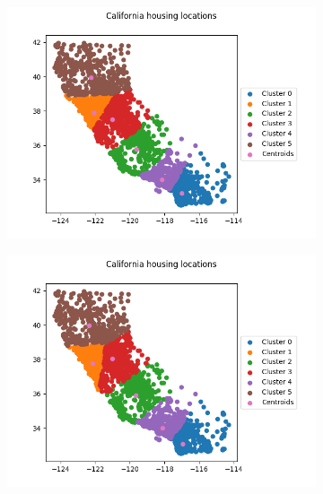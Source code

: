 \documentclass[a4paper]{article}
\begin{document}
\begin{figure}[!htp]
	\begin{subfigure}{0.5\columnwidth}
		\centering
		\includegraphics[width=\textwidth]{images/2.png}
		\caption{}
		\label{figure:iteration-2}
	\end{subfigure}\hfill
	\begin{subfigure}{0.5\columnwidth}
		\centering
		\includegraphics[width=\textwidth]{images/3.png}
		\caption{}
		\label{figure:iteration-3}
	\end{subfigure}
	

\end{figure}
\end{document}
